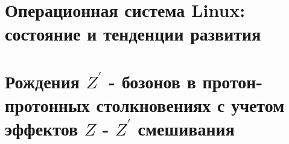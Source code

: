 \documentclass[12pt,a4paper]{styles/report}
\begin{document}
	
\renewcommand\contentsname{СОДЕРЖАНИЕ}
\renewcommand{\bibname}{СПИСОК ИСПОЛЬЗОВАННЫХ ИСТОЧНИКОВ}
\renewcommand\chaptername{ГЛАВА}
\renewcommand\figurename{Рисунок}
\renewcommand\tablename{Таблица}



\newpage
\pagestyle{plain}  \setcounter{page}{2}
\large \tableofcontents

%

\chapter{Операционная система Linux: состояние и тенденции развития}






\chapter{Рождения $Z^\prime$ - бозонов в протон-протонных столкновениях с учетом эффектов $Z$ - $Z^\prime$ смешивания}




\newpage
\begin{thebibliography}{9999.}



\end{thebibliography}
\end{document}
